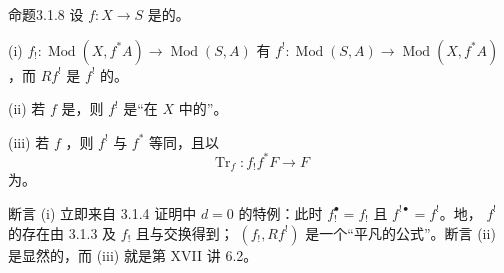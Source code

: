 \begin{SGAresult}{命题}{3.1.8}
设 $f\colon X\to S$ 是的。

(i)  $f_!\colon\operatorname{Mod}(X,f^*A)\to\operatorname{Mod}(S,A)$ 有 $f^!\colon\operatorname{Mod}(S,A)\to\operatorname{Mod}(X,f^*A)$，而 $Rf^!$ 是 $f^!$ 的。

(ii) 若 $f$ 是，则 $f^!$ 是“在 $X$ 中的”。

(iii) 若 $f$ ，则 $f^!$ 与 $f^*$ 等同，且以
\[
 \operatorname{Tr}_f\colon f_!f^*F\longrightarrow F
\]
为。
\end{SGAresult}
断言 (i) 立即来自 3.1.4 证明中 $d=0$ 的特例：此时 $f_!^\bullet=f_!$ 且 $f^{!\bullet}=f^!$。地， $f^!$ 的存在由 3.1.3 及 $f_!$ 且与交换得到； $(f_!,Rf^!)$ 是一个“平凡的公式”。断言 (ii) 是显然的，而 (iii) 就是第 XVII 讲 6.2。


